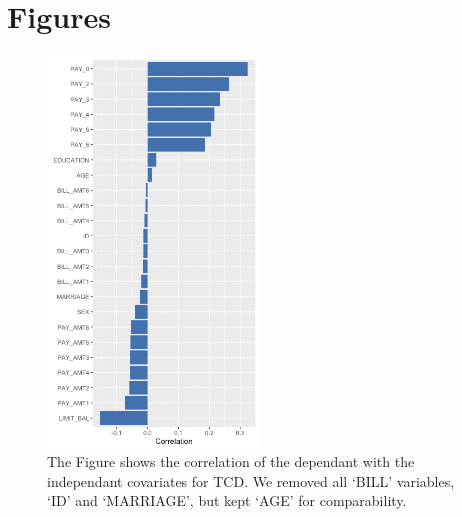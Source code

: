 \section{Figures}

\begin{figure}[!htb]
	\begin{center}
		\includegraphics[width=0.5\textwidth]{img/corrplot}
		\caption{The Figure shows the correlation of the dependant with the independant covariates for TCD. We removed all `BILL' variables, `ID' and `MARRIAGE', but kept `AGE' for comparability.}
		\label{Fig:corrplot}
	\end{center}
\end{figure}

\pagebreak

